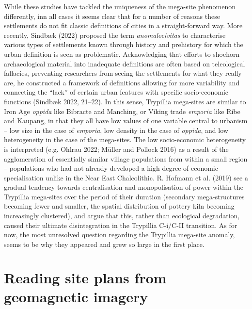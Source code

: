 \documentclass[
  12pt,
  a4paper, twoside]{book}
\begin{document}
While these studies have tackled the uniqueness of the mega-site phenomenon differently, inn all cases it seems clear that for a number of reasons these settlements do not fit classic definitions of cities in a straight-forward way. More recently, Sindbæk (2022) proposed the term \emph{anomalocivitas} to characterise various types of settlements known through history and prehistory for which the urban definition is seen as problematic. Acknowledging that efforts to shoehorn archaeological material into inadequate definitions are often based on teleological fallacies, preventing researchers from seeing the settlements for what they really are, he constructed a framework of definitions allowing for more variability and connecting the ``lack'' of certain urban features with specific socio-economic functions (Sindbæk 2022, 21--22). In this sense, Trypillia mega-sites are similar to Iron Age \emph{oppida} like Bibracte and Manching, or Viking trade \emph{emporia} like Ribe and Kaupang, in that they all have low values of one variable central to urbanism -- low size in the case of \emph{emporia}, low density in the case of \emph{oppida}, and low heterogeneity in the case of the mega-sites. The low socio-economic heterogeneity is interpreted (e.g. Ohlrau 2022; Müller and Pollock 2016) as a result of the agglomeration of essentially similar village populations from within a small region -- populations who had not already developed a high degree of economic specialisation unlike in the Near East Chalcolithic. R. Hofmann et al. (2019) see a gradual tendency towards centralisation and monopolisation of power within the Trypillia mega-sites over the period of their duration (secondary mega-structures becoming fewer and smaller, the spatial distribution of pottery kiln becoming increasingly clustered), and argue that this, rather than ecological degradation, caused their ultimate disintegration in the Trypillia C-i/C-II transition. As for now, the most unresolved question regarding the Trypillia mega-site anomaly, seems to be why they appeared and grew so large in the first place.

\hypertarget{spatial-data}{%
\section{Reading site plans from geomagnetic imagery}\label{spatial-data}}
\end{document}
